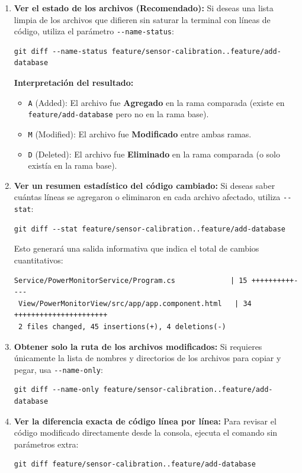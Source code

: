 \documentclass[
10pt, %
a4paper, %
oneside, %
headinclude,footinclude, %
BCOR5mm, %
]{scrartcl}
\begin{document}
\begin{enumerate}
	\item \textbf{Ver el estado de los archivos (Recomendado):}
	Si deseas una lista limpia de los archivos que difieren sin saturar la terminal con líneas de código, utiliza el parámetro \texttt{-{}-name-status}:
	\begin{lstlisting}[language=DOS]
	git diff --name-status feature/sensor-calibration..feature/add-database
	\end{lstlisting}
	\textbf{Interpretación del resultado:}
	\begin{itemize}
		\item \texttt{A} (Added): El archivo fue \textbf{Agregado} en la rama comparada (existe en \texttt{feature/add-database} pero no en la rama base).
		\item \texttt{M} (Modified): El archivo fue \textbf{Modificado} entre ambas ramas.
		\item \texttt{D} (Deleted): El archivo fue \textbf{Eliminado} en la rama comparada (o solo existía en la rama base).
	\end{itemize}
	
	\item \textbf{Ver un resumen estadístico del código cambiado:}
	Si deseas saber cuántas líneas se agregaron o eliminaron en cada archivo afectado, utiliza \texttt{-{}-stat}:
	\begin{lstlisting}[language=DOS]
	git diff --stat feature/sensor-calibration..feature/add-database
	\end{lstlisting}
	Esto generará una salida informativa que indica el total de cambios cuantitativos:
	\begin{lstlisting}[language=plaintext, style=miestiloclaro]
Service/PowerMonitorService/Program.cs             | 15 ++++++++++----
 View/PowerMonitorView/src/app/app.component.html   | 34 ++++++++++++++++++++++
 2 files changed, 45 insertions(+), 4 deletions(-)
	\end{lstlisting}
	
	\item \textbf{Obtener solo la ruta de los archivos modificados:}
	Si requieres únicamente la lista de nombres y directorios de los archivos para copiar y pegar, usa \texttt{-{}-name-only}:
	\begin{lstlisting}[language=DOS]
	git diff --name-only feature/sensor-calibration..feature/add-database
	\end{lstlisting}
	
	\item \textbf{Ver la diferencia exacta de código línea por línea:}
	Para revisar el código modificado directamente desde la consola, ejecuta el comando sin parámetros extra:
	\begin{lstlisting}[language=DOS]
	git diff feature/sensor-calibration..feature/add-database
	\end{lstlisting}
\end{enumerate}
\end{document}
